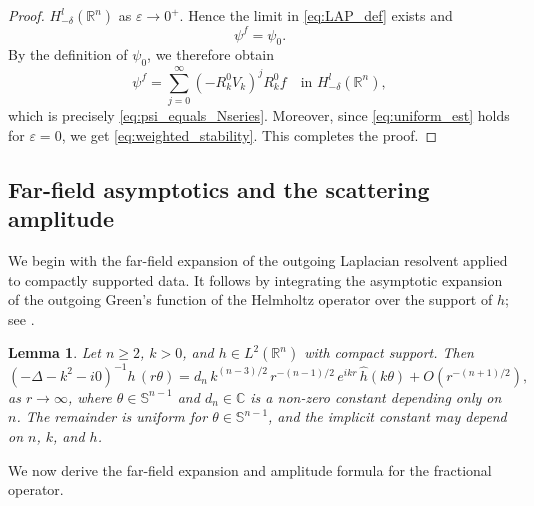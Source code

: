 \documentclass[12pt,a4paper]{amsart}
\numberwithin{equation}{section}
\theoremstyle{plain}
\newtheorem{lemma}[theorem]{Lemma}
\theoremstyle{definition}
\begin{document}
\begin{proof}
    $H^l_{-\delta}(\mathbb{R}^n)$ as $\varepsilon \to 0^+$. Hence the limit in \eqref{eq:LAP_def} exists and
    \begin{equation*}
        \psi^f=\psi_0.
    \end{equation*}
    By the definition of $\psi_0$, we therefore obtain
    \begin{equation*}
        \psi^f
        =
        \sum_{j=0}^\infty
        (-R_k^0 V_k)^j R_k^0 f
        \quad\text{in } H^l_{-\delta}(\mathbb{R}^n),
    \end{equation*}
    which is precisely \eqref{eq:psi_equals_Nseries}. Moreover, since
    \eqref{eq:uniform_est} holds for $\varepsilon=0$, we get
    \eqref{eq:weighted_stability}. This completes the proof.
\end{proof}



\subsection{Far-field asymptotics and the scattering amplitude}

We begin with the far-field expansion of the outgoing Laplacian resolvent applied to compactly supported data. It follows by integrating the asymptotic expansion of the outgoing Green's function of the Helmholtz operator over the support of $h$; see \cite[Eq. (7.3.2)]{FeldmanSaloUhlmann}.

\begin{lemma}\label{lem:laplacian_farfield}
Let $n \geq 2$, $k > 0$, and $h \in L^2(\mathbb{R}^n)$ with compact support.
Then
\begin{equation}\label{eq:laplacian_farfield}
(-\Delta - k^2 - i0)^{-1}h\,(r\theta)
=
d_n\, k^{(n-3)/2}\,
r^{-(n-1)/2}\, e^{ikr}\,\hat{h}(k\theta)
+ O(r^{-(n+1)/2}),
\end{equation}
as $r\to\infty$, where $\theta \in \mathbb{S}^{n-1}$ and $d_n\in \mathbb{C}$ is a non-zero constant depending only on $n$.
The remainder is uniform for $\theta\in\mathbb S^{n-1}$, and the implicit
constant may depend on $n$, $k$, and $h$.
\end{lemma}

We now derive the far-field expansion and amplitude formula for the
fractional operator.
\end{document}
